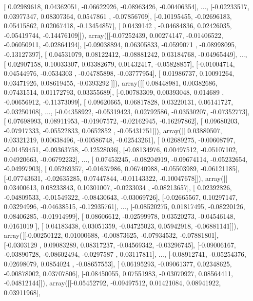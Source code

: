 \documentclass{article}
\begin{document}
       [ 0.02989618,  0.04362051, -0.06622926, -0.08963426, -0.00406354],
       ..., 
       [-0.02233517,  0.03977347,  0.08307364,  0.0547861 , -0.07856709],
       [-0.10195455, -0.02696183,  0.05415862,  0.02067418, -0.13454857],
       [ 0.0439142 , -0.04684836,  0.02426035, -0.05419744, -0.14476109]]), array([[-0.07252439,  0.00274147, -0.01406522, -0.06050911, -0.02864194],
       [-0.09038894,  0.06305833, -0.0599071 , -0.08998095, -0.13127397],
       [ 0.04531079,  0.08122412, -0.08881242,  0.03184768, -0.04965449],
       ..., 
       [ 0.02907158,  0.10033307,  0.03382679,  0.01432417, -0.05828857],
       [-0.01004714,  0.04544976, -0.0534303 , -0.04785898, -0.03777954],
       [ 0.01986737,  0.10091264,  0.03471926,  0.08619455, -0.0393292 ]]), array([[ 0.08448981,  0.00382686,  0.07431514,  0.01172793,  0.03355689],
       [-0.00783309,  0.00393048,  0.014689  , -0.00656912, -0.11373099],
       [ 0.09620665,  0.06817828,  0.03220131,  0.06141727, -0.03250108],
       ..., 
       [-0.04358922, -0.05319423,  0.02792586, -0.03530207, -0.07352773],
       [ 0.07698993,  0.08911953, -0.01907572, -0.02162945, -0.16297862],
       [ 0.09680203, -0.07917333, -0.05522833,  0.0652852 , -0.05431751]]), array([[ 0.03880507,  0.03321219,  0.00638496, -0.00586748, -0.02543261],
       [ 0.02689275, -0.00608797, -0.01459451, -0.09363758, -0.12528036],
       [-0.08134976,  0.00497512, -0.05107102,  0.04920663, -0.06792232],
       ..., 
       [ 0.07453245, -0.08204919, -0.09674114, -0.05232654, -0.04997903],
       [ 0.05269357, -0.01637986,  0.06740988, -0.05503989, -0.06121185],
       [-0.07743631, -0.02635285,  0.07447844, -0.01143322, -0.10047678]]), array([[ 0.03400613,  0.08233843,  0.10301007, -0.0233034 , -0.08213657],
       [ 0.02392826, -0.04809533, -0.01549322, -0.08430643, -0.03069726],
       [-0.02665567,  0.10297147,  0.03294996, -0.04638515, -0.12935761],
       ..., 
       [-0.08520275,  0.01817495, -0.08220126,  0.08406285, -0.01914999],
       [ 0.08606612, -0.02599978,  0.03520273, -0.04546148,  0.0161019 ],
       [ 0.04183438,  0.03051359, -0.04725023,  0.05942918, -0.06881141]]), array([[-0.00250122,  0.01000688, -0.00873625, -0.07934532, -0.07881801],
       [-0.0303129 ,  0.09083289,  0.08317237, -0.04569342, -0.03296745],
       [-0.09006167, -0.03890728, -0.08602494, -0.0297587 ,  0.03117811],
       ..., 
       [-0.08912741, -0.05254376,  0.02698079,  0.0854024 , -0.08657553],
       [ 0.06195293, -0.09061377,  0.02348625, -0.00878002,  0.03707806],
       [-0.08450055,  0.07551983, -0.03070927,  0.08564411, -0.04812144]]), array([[-0.05452792, -0.09497512,  0.01421084,  0.08941922,  0.03911968],
\end{document}
